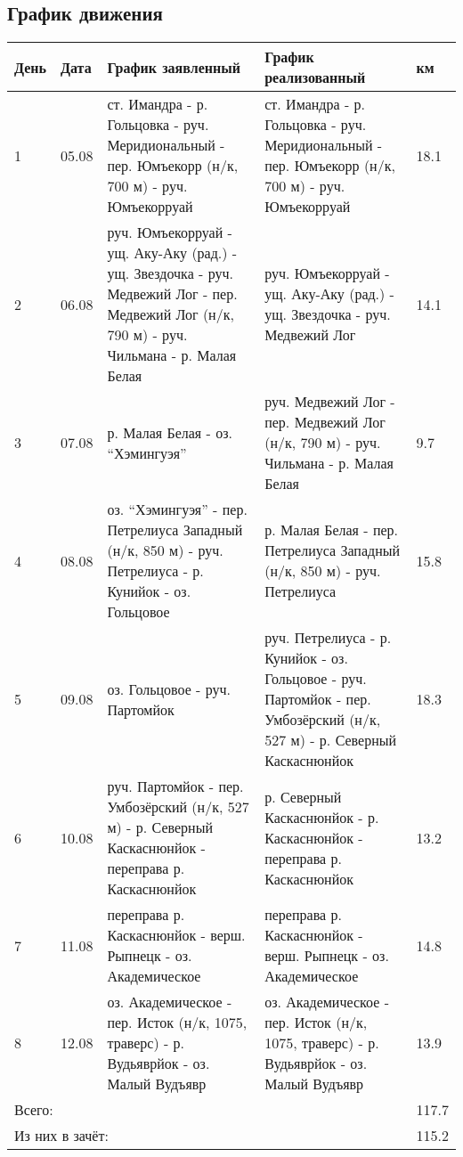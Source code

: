 \subsection{График движения}
\begin{longtable}{|l|l|p{6cm}|p{6cm}|l|}
    \hline
    День & Дата & График заявленный & График реализованный & км\\
    \hline
    1 &
    05.08 &
    ст. Имандра - р. Гольцовка - руч. Меридиональный - пер. Юмъекорр (н/к, 700 м) - руч. Юмъекорруай &
    ст. Имандра - р. Гольцовка - руч. Меридиональный - пер. Юмъекорр (н/к, 700 м) - руч. Юмъекорруай &
    18.1
    \\
    \hline
    2 &
    06.08 &
    руч. Юмъекорруай - ущ. Аку-Аку (рад.) - ущ. Звездочка - руч. Медвежий Лог - пер. Медвежий Лог (н/к, 790 м)
    - руч. Чильмана - р. Малая Белая &
    руч. Юмъекорруай - ущ. Аку-Аку (рад.) - ущ. Звездочка - руч. Медвежий Лог &
    14.1
    \\
    \hline
    3 &
    07.08 &
    р. Малая Белая - оз. ``Хэмингуэя'' &
    руч. Медвежий Лог - пер. Медвежий Лог (н/к, 790 м) - руч. Чильмана - р. Малая Белая &
    9.7
    \\
    \hline
    4 &
    08.08 &
    оз. “Хэмингуэя” - пер. Петрелиуса Западный (н/к, 850 м) - руч. Петрелиуса - р. Кунийок - оз. Гольцовое &
    р. Малая Белая - пер. Петрелиуса Западный (н/к, 850 м) - руч. Петрелиуса &
    15.8
    \\
    \hline
    5 &
    09.08 &
    оз. Гольцовое - руч. Партомйок &
    руч. Петрелиуса - р. Кунийок - оз. Гольцовое  - руч. Партомйок - пер. Умбозёрский (н/к, 527 м) - р. Северный Каскаснюнйок &
	18.3
    \\
    \hline
    6 &
    10.08 &
    руч. Партомйок - пер. Умбозёрский (н/к, 527 м) - р. Северный Каскаснюнйок - переправа р. Каскаснюнйок &
    р. Северный Каскаснюнйок - р. Каскаснюнйок - переправа р. Каскаснюнйок &
	13.2
    \\
    \hline
    7 &
    11.08 &
    переправа р. Каскаснюнйок - верш. Рыпнецк - оз. Академическое &
    переправа р. Каскаснюнйок - верш. Рыпнецк - оз. Академическое &
	14.8
    \\
    \hline
    8 &
    12.08 &
    оз. Академическое - пер. Исток (н/к, 1075, траверс) - р. Вудьяврйок - оз. Малый Вудъявр &
    оз. Академическое - пер. Исток (н/к, 1075, траверс) - р. Вудьяврйок - оз. Малый Вудъявр &
	13.9
    \\
    \hline
    \multicolumn{4}{|l|}{Всего:} &
	117.7
    \\
    \multicolumn{4}{|l|}{Из них в зачёт:} &
    115.2
    \\
    \hline
\end{longtable}

